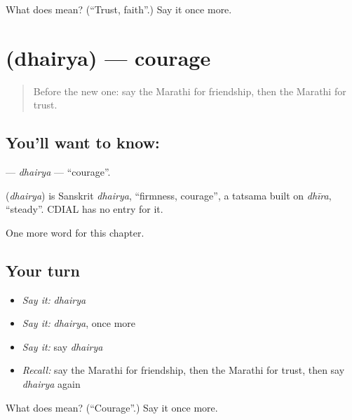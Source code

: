 \begin{tcolorbox}[breakable,colback=teal!4,colframe=teal!35!black,title={Before you move on}]
What does  mean? (\textquotedblleft{}Trust, faith\textquotedblright{}.) Say it once more.
\end{tcolorbox}
\section[\texorpdfstring{\mr{धैर्य} (dhairya)}{धैर्य (dhairya)}]{ (dhairya) — courage}

\label{lesson:MR-C257-dhairya}



\begin{quote}
Before the new one: say the Marathi for friendship, then the Marathi for trust.
\end{quote}

\subsection*{You'll want to know: }
\textbf{} — \emph{dhairya} — \textquotedblleft{}courage\textquotedblright{}.

\begin{cousinweb}
\textbf{} (\emph{dhairya}) is Sanskrit \emph{dhairya}, \textquotedblleft{}firmness, courage\textquotedblright{}, a tatsama built on \emph{dhīra}, \textquotedblleft{}steady\textquotedblright{}. CDIAL has no entry for it.
\end{cousinweb}

\begin{grammarlens}[title={What you've built}]
One more word for this chapter.
\end{grammarlens}

\subsection*{Your turn}
\begin{itemize}
\raggedright
  \item \emph{Say it:} \emph{dhairya}
  \item \emph{Say it:} \emph{dhairya}, once more
  \item \emph{Say it:} say \emph{dhairya}
  \item \emph{Recall:} say the Marathi for friendship, then the Marathi for trust, then say \emph{dhairya} again
\end{itemize}

\begin{tcolorbox}[breakable,colback=teal!4,colframe=teal!35!black,title={Before you move on}]
What does  mean? (\textquotedblleft{}Courage\textquotedblright{}.) Say it once more.
\end{tcolorbox}
